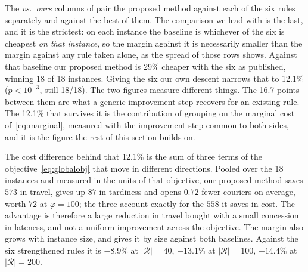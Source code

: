 The \emph{vs.\ ours} columns of  pair the proposed method
against each of the six rules separately and against the best of them. The
comparison we lead with is the last, and it is the strictest: on each instance
the baseline is whichever of the six is cheapest \emph{on that instance}, so
the margin against it is necessarily smaller than the margin against any rule
taken alone, as the spread of those rows shows. Against that baseline our proposed method is
29\% cheaper with the six as published, winning 18
of 18 instances. Giving the six our own descent narrows that to
12.1\% ($p<10^{-3}$, still 18/18). The two
figures measure different things. The
16.7 points between them are what a generic
improvement step recovers for an existing rule. The
12.1\% that survives it is the contribution of
grouping on the marginal cost of~\eqref{eq:marginal}, measured with the
improvement step common to both sides, and it is the figure the rest of this
section builds on.


The cost difference behind that 12.1\% is the sum of three
terms of the objective~\eqref{eq:globalobj} that move in different directions.
Pooled over the 18 instances and measured in the units of that objective,
our proposed method saves $573$ in travel, gives up $87$ in
tardiness and opens $0.72$ fewer couriers on average,
worth $72$ at $\varphi=100$; the three account exactly
for the $558$ it saves in cost. The advantage is therefore a
large reduction in travel bought with a small concession in lateness, and not a
uniform improvement across the objective. The margin also grows with instance size, and
 gives it by size against both baselines. Against the six
strengthened rules it is $-8.9\%$ at $|\mathcal{R}|=40$, $-13.1\%$ at $|\mathcal{R}|=100$, $-14.4\%$ at $|\mathcal{R}|=200$.

